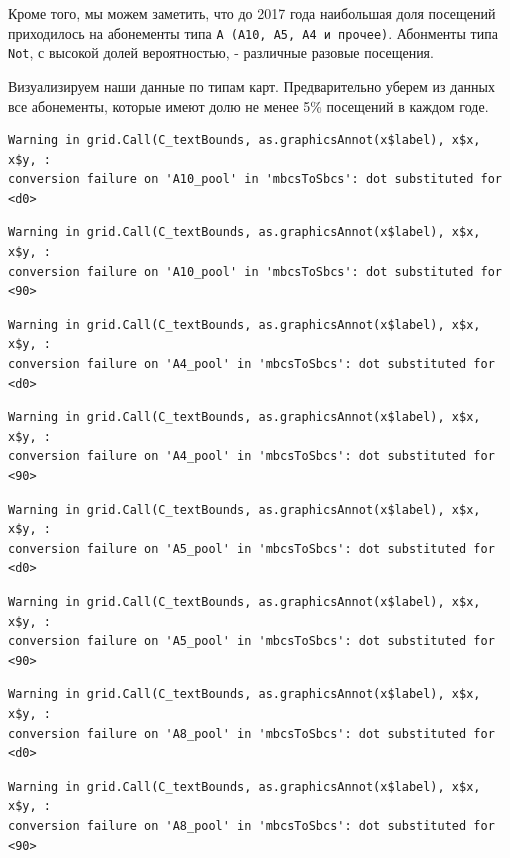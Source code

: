 \documentclass[
  letterpaper,
  DIV=11,
  numbers=noendperiod]{scrartcl}
\begin{document}
Кроме того, мы можем заметить, что до 2017 года наибольшая доля
посещений приходилось на абонементы типа
\texttt{А\ (А10,\ А5,\ А4\ и\ прочее)}. Абонменты типа \texttt{Not}, с
высокой долей вероятностью, - различные разовые посещения.

Визуализируем наши данные по типам карт. Предварительно уберем из данных
все абонементы, которые имеют долю не менее 5\% посещений в каждом годе.

\begin{verbatim}
Warning in grid.Call(C_textBounds, as.graphicsAnnot(x$label), x$x, x$y, :
conversion failure on 'А10_pool' in 'mbcsToSbcs': dot substituted for <d0>
\end{verbatim}

\begin{verbatim}
Warning in grid.Call(C_textBounds, as.graphicsAnnot(x$label), x$x, x$y, :
conversion failure on 'А10_pool' in 'mbcsToSbcs': dot substituted for <90>
\end{verbatim}

\begin{verbatim}
Warning in grid.Call(C_textBounds, as.graphicsAnnot(x$label), x$x, x$y, :
conversion failure on 'А4_pool' in 'mbcsToSbcs': dot substituted for <d0>
\end{verbatim}

\begin{verbatim}
Warning in grid.Call(C_textBounds, as.graphicsAnnot(x$label), x$x, x$y, :
conversion failure on 'А4_pool' in 'mbcsToSbcs': dot substituted for <90>
\end{verbatim}

\begin{verbatim}
Warning in grid.Call(C_textBounds, as.graphicsAnnot(x$label), x$x, x$y, :
conversion failure on 'А5_pool' in 'mbcsToSbcs': dot substituted for <d0>
\end{verbatim}

\begin{verbatim}
Warning in grid.Call(C_textBounds, as.graphicsAnnot(x$label), x$x, x$y, :
conversion failure on 'А5_pool' in 'mbcsToSbcs': dot substituted for <90>
\end{verbatim}

\begin{verbatim}
Warning in grid.Call(C_textBounds, as.graphicsAnnot(x$label), x$x, x$y, :
conversion failure on 'А8_pool' in 'mbcsToSbcs': dot substituted for <d0>
\end{verbatim}

\begin{verbatim}
Warning in grid.Call(C_textBounds, as.graphicsAnnot(x$label), x$x, x$y, :
conversion failure on 'А8_pool' in 'mbcsToSbcs': dot substituted for <90>
\end{verbatim}
\end{document}
